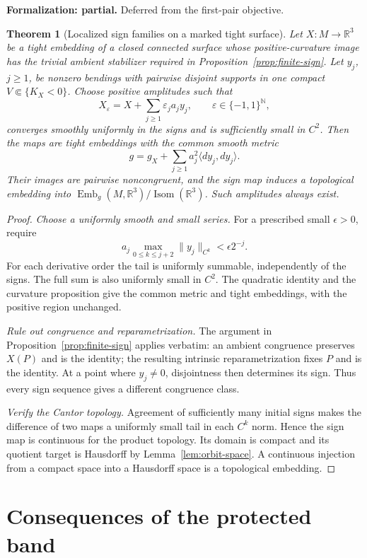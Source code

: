\documentclass[11pt]{amsart}
\newtheorem{theorem}{Theorem}[section]
\theoremstyle{definition}
\theoremstyle{remark}
\newcommand{\R}{\mathbb R}\newcommand{\Sph}{\mathbb S}
\DeclareMathOperator{\Isom}{Isom}\DeclareMathOperator{\Emb}{Emb}
\numberwithin{equation}{section}
\begin{document}
\par\noindent\textbf{Formalization: partial.} Deferred from the first-pair objective.\par
\begin{theorem}[Localized sign families on a marked tight surface]
\label{thm:localized-sign}
Let $X:M\to\R^3$ be a tight embedding of a closed connected surface
whose positive-curvature image has the trivial ambient stabilizer
required in Proposition~\ref{prop:finite-sign}. Let $y_j$, $j\ge1$,
be nonzero bendings with pairwise disjoint supports in
one compact $V\Subset\{K_X<0\}$. Choose positive amplitudes such that
\[
 X_\varepsilon=X+\sum_{j\ge1}\varepsilon_ja_jy_j,
 \qquad\varepsilon\in\{-1,1\}^{\mathbb N},
\]
converges smoothly uniformly in the signs and is sufficiently small in
$C^2$. Then the maps are tight embeddings with the common smooth metric
\[
 g=g_X+\sum_{j\ge1}a_j^2\langle dy_j,dy_j\rangle.
\]
Their images are pairwise noncongruent, and the sign map induces a
topological embedding into $\Emb_g(M,\R^3)/\Isom(\R^3)$.
Such amplitudes always exist.
\end{theorem}
\begin{proof}
\emph{Choose a uniformly smooth and small series.}
For a prescribed small $\epsilon>0$, require
\[
 a_j\max_{0\le k\le j+2}\|y_j\|_{C^k}<\epsilon2^{-j}.
\]
For each derivative order the tail is uniformly summable, independently
of the signs. The full sum is also uniformly small in $C^2$.
The quadratic identity and the curvature proposition give the common
metric and tight embeddings, with the positive region unchanged.

\emph{Rule out congruence and reparametrization.}
The argument in Proposition~\ref{prop:finite-sign} applies verbatim:
an ambient congruence preserves $X(P)$ and is the identity; the resulting
intrinsic reparametrization fixes $P$ and is the identity. At a point
where $y_j\ne0$, disjointness then determines its sign. Thus every sign
sequence gives a different congruence class.

\emph{Verify the Cantor topology.}
Agreement of sufficiently many initial signs makes the difference of two
maps a uniformly small tail in each $C^k$ norm. Hence the sign map is
continuous for the product topology. Its domain is compact and its
quotient target is Hausdorff by Lemma~\ref{lem:orbit-space}. A continuous
injection from a compact space into a Hausdorff space is a topological
embedding.
\end{proof}

\section{Consequences of the protected band}\label{sec:applications}
\end{document}
